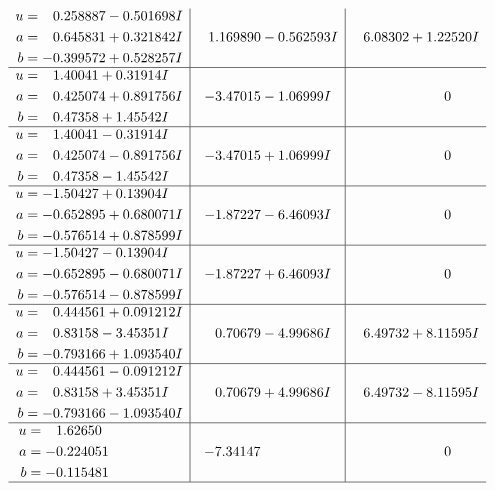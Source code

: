 \documentclass[1p]{elsarticle_modified}
\theoremstyle{definition}
\begin{document}
$$\begin{array}{c|c|c}
\begin{aligned}
u &= \phantom{-}0.258887 - 0.501698 I \\
a &= \phantom{-}0.645831 + 0.321842 I \\
b &= -0.399572 + 0.528257 I\end{aligned}
 & \phantom{-}1.169890 - 0.562593 I & \phantom{-}6.08302 + 1.22520 I \\ \hline\begin{aligned}
u &= \phantom{-}1.40041 + 0.31914 I \\
a &= \phantom{-}0.425074 + 0.891756 I \\
b &= \phantom{-}0.47358 + 1.45542 I\end{aligned}
 & -3.47015 - 1.06999 I & \phantom{-0.000000 } 0 \\ \hline\begin{aligned}
u &= \phantom{-}1.40041 - 0.31914 I \\
a &= \phantom{-}0.425074 - 0.891756 I \\
b &= \phantom{-}0.47358 - 1.45542 I\end{aligned}
 & -3.47015 + 1.06999 I & \phantom{-0.000000 } 0 \\ \hline\begin{aligned}
u &= -1.50427 + 0.13904 I \\
a &= -0.652895 + 0.680071 I \\
b &= -0.576514 + 0.878599 I\end{aligned}
 & -1.87227 - 6.46093 I & \phantom{-0.000000 } 0 \\ \hline\begin{aligned}
u &= -1.50427 - 0.13904 I \\
a &= -0.652895 - 0.680071 I \\
b &= -0.576514 - 0.878599 I\end{aligned}
 & -1.87227 + 6.46093 I & \phantom{-0.000000 } 0 \\ \hline\begin{aligned}
u &= \phantom{-}0.444561 + 0.091212 I \\
a &= \phantom{-}0.83158 - 3.45351 I \\
b &= -0.793166 + 1.093540 I\end{aligned}
 & \phantom{-}0.70679 - 4.99686 I & \phantom{-}6.49732 + 8.11595 I \\ \hline\begin{aligned}
u &= \phantom{-}0.444561 - 0.091212 I \\
a &= \phantom{-}0.83158 + 3.45351 I \\
b &= -0.793166 - 1.093540 I\end{aligned}
 & \phantom{-}0.70679 + 4.99686 I & \phantom{-}6.49732 - 8.11595 I \\ \hline\begin{aligned}
u &= \phantom{-}1.62650\phantom{ +0.000000I} \\
a &= -0.224051\phantom{ +0.000000I} \\
b &= -0.115481\phantom{ +0.000000I}\end{aligned}
 & -7.34147\phantom{ +0.000000I} & \phantom{-0.000000 } 0\\
 \hline 
 \end{array}$$\newpage\newpage\renewcommand{\arraystretch}{1}
\end{document}
